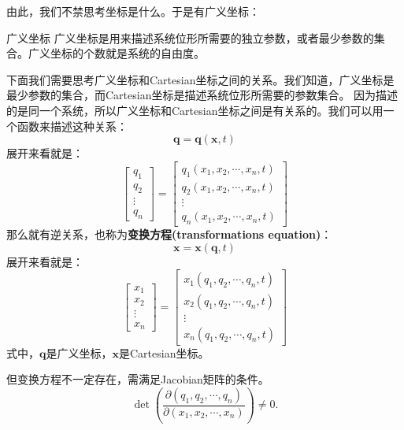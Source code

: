 由此，我们不禁思考坐标是什么。于是有广义坐标：

\begin{mydefinition}{广义坐标}
广义坐标是用来描述系统位形所需要的独立参数，或者最少参数的集合。广义坐标的个数就是系统的自由度。
\end{mydefinition}
下面我们需要思考广义坐标和Cartesian坐标之间的关系。我们知道，广义坐标是最少参数的集合，而Cartesian坐标是描述系统位形所需要的参数集合。
因为描述的是同一个系统，所以广义坐标和Cartesian坐标之间是有关系的。我们可以用一个函数来描述这种关系：
\begin{equation}\label{eq:1.1}
\bm{q} = \bm{q}(\bm{x},t)
\end{equation}
展开来看就是：
    \begin{equation}\label{eq:1.2}
\begin{bmatrix} q_1 \\ q_2 \\ \vdots \\ q_n \end{bmatrix} = \begin{bmatrix} q_1(x_1,x_2,\cdots,x_n,t) \\ q_2(x_1,x_2,\cdots,x_n,t) \\ \vdots \\ q_n(x_1,x_2,\cdots,x_n,t) \end{bmatrix}
\end{equation}
那么就有逆关系，也称为\textbf{变换方程(transformations equation)}：
\begin{equation}\label{eq:1.3}
\bm{x} = \bm{x}(\bm{q},t)
\end{equation}
展开来看就是：
\begin{equation}\label{eq:1.4}
\begin{bmatrix} x_1 \\ x_2 \\ \vdots \\ x_n \end{bmatrix} = \begin{bmatrix} x_1(q_1,q_2,\cdots,q_n,t) \\ x_2(q_1,q_2,\cdots,q_n,t) \\ \vdots \\ x_n(q_1,q_2,\cdots,q_n,t) \end{bmatrix}
\end{equation}
式中，$\bm{q}$是广义坐标，$\bm{x}$是Cartesian坐标。

但变换方程不一定存在，需满足Jacobian矩阵的条件。
\begin{equation}\label{eq:1.5}
\det\left(\frac{\partial(q_1, q_2, \cdots, q_n)}{\partial(x_1, x_2, \cdots, x_n)}\right) \neq 0.
\end{equation}

